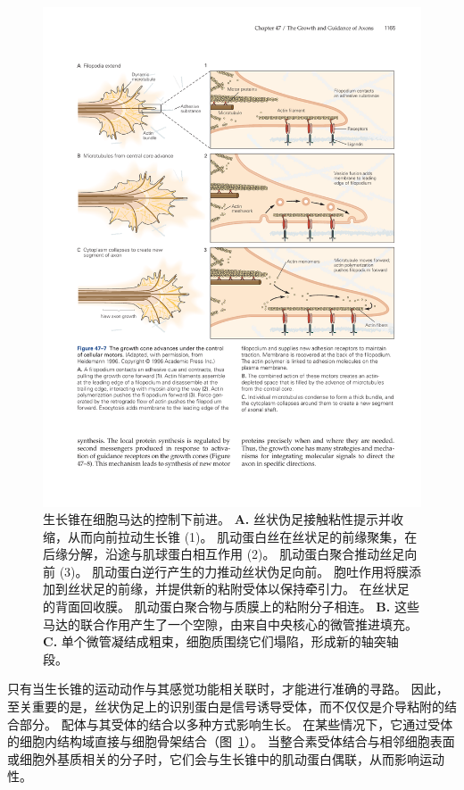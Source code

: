 \begin{figure}[htbp]
	\centering
	\includegraphics[width=0.95\linewidth]{chap47/fig_47_7}
	\caption{生长锥在细胞马达的控制下前进\cite{heidemann1996cytoplasmic}。
		\textbf{A.} 丝状伪足接触粘性提示并收缩，从而向前拉动生长锥 (1)。
		肌动蛋白丝在丝状足的前缘聚集，在后缘分解，沿途与肌球蛋白相互作用 (2)。
		肌动蛋白聚合推动丝足向前 (3)。
		肌动蛋白逆行产生的力推动丝状伪足向前。
		胞吐作用将膜添加到丝状足的前缘，并提供新的粘附受体以保持牵引力。
		在丝状足的背面回收膜。
		肌动蛋白聚合物与质膜上的粘附分子相连。
		\textbf{B.} 这些马达的联合作用产生了一个空隙，由来自中央核心的微管推进填充。
		\textbf{C.} 单个微管凝结成粗束，细胞质围绕它们塌陷，形成新的轴突轴段。}
	\label{fig:47_7}
\end{figure}


只有当生长锥的运动动作与其感觉功能相关联时，才能进行准确的寻路。
因此，至关重要的是，丝状伪足上的识别蛋白是信号诱导受体，而不仅仅是介导粘附的结合部分。
配体与其受体的结合以多种方式影响生长。
在某些情况下，它通过受体的细胞内结构域直接与细胞骨架结合（图~\ref{fig:47_7}）。
当整合素受体结合与相邻细胞表面或细胞外基质相关的分子时，它们会与生长锥中的肌动蛋白偶联，从而影响运动性。


